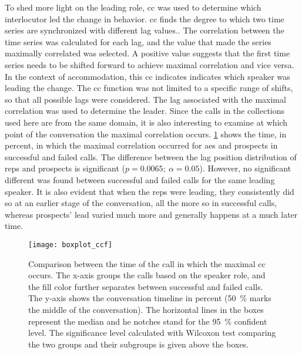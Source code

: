 To shed more light on the leading role, \acl{cc} was used to determine which interlocutor led the change in behavior.
\Acl{cc} finds the degree to which two time series are synchronized with different lag values..
The correlation between the time series was calculated for each lag, and the value that made the series maximally correlated was selected.
A positive value suggests that the first time series needs to be shifted forward to achieve maximal correlation and vice versa.
In the context of accommodation, this \acl{cc} indicates indicates which speaker was leading the change.
The \acl{cc} function was not limited to a specific range of shifts, so that all possible lags were considered.
The lag associated with the maximal correlation was used to determine the leader.
Since the calls in the collections used here are from the same domain, it is also interesting to examine at which point of the conversation the maximal correlation occurs.
\cref{fig:barplot_conv_leaders} shows the time, in percent, in which the maximal correlation occurred for \acp{ae} and prospects in successful and failed calls.
The difference between the lag position distribution of reps and prospects is significant ($p = 0.0065;\ \alpha = 0.05$).
However, no significant different was found between successful and failed calls for the same leading speaker.
It is also evident that when the reps were leading, they consistently did so at an earlier stage of the conversation, all the more so in successful calls, whereas prospects' lead varied much more and generally happens at a much later time.
%
\begin{figure}
	\centering
	\texttt{[image: boxplot\_ccf]}
	\caption[Representatives' and prospects' lead-taking times in successful and failed calls]
		{Comparison between the time of the call in which the maximal \acl{cc} occurs.
		The x-axis groups the calls based on the speaker role, and the fill color further separates between successful and failed calls.
		The y-axis shows the conversation timeline in percent (\SI{50}{\percent} marks the middle of the conversation).
		The horizontal lines in the boxes represent the median
		and he notches stand for the \SI{95}{\percent} confident level.
		The significance level calculated with Wilcoxon test comparing the two groups and their subgroups is given above the boxes.}
	\label{fig:barplot_conv_leaders}
\end{figure}
